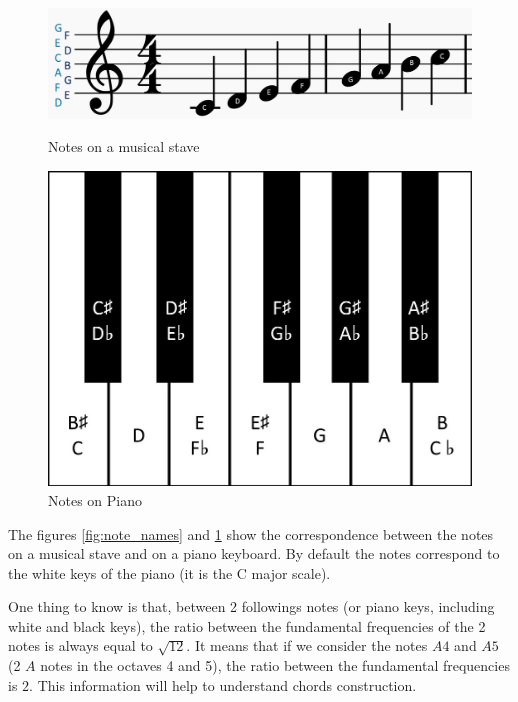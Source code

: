 \documentclass[12pt]{report}
\begin{document}
\begin{figure}[H]
   \begin{minipage}{0.5\textwidth}
     \centering
     \includegraphics[width=.9\linewidth]{images/music/stave/note_names.jpg}
     \caption{Notes on a musical stave}
     \label{fig:note_names}
   \end{minipage}\hfill
   \begin{minipage}{0.5\textwidth}
     \centering
     \includegraphics[width=.9\linewidth]{images/music/piano/piano_keys.jpg}
     \caption{Notes on Piano}
     \label{fig:piano_keys}
   \end{minipage}
\end{figure}

The figures \ref{fig:note_names} and \ref{fig:piano_keys} show the correspondence between the notes on a musical stave and on a piano keyboard. By default the notes correspond to the white keys of the piano (it is the C major scale).

One thing to know is that, between 2 followings notes (or piano keys, including white and black keys), the ratio between the fundamental frequencies of the 2 notes is always equal to $\sqrt{12}$. It means that if we consider the notes $A4$ and $A5$ (2 $A$ notes in the octaves 4 and 5), the ratio between the fundamental frequencies is $2$. This information will help to understand chords construction.
\end{document}
